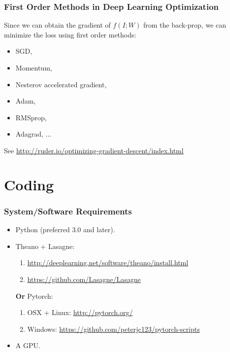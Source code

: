 \documentclass[10pt]{beamer}
\begin{document}
\begin{frame}
\frametitle{First Order Methods in Deep Learning Optimization}
Since we can obtain the gradient of $f(I;W)$ from the back-prop, we can minimize the loss using first order methods:
\begin{itemize}
	\item SGD,
	\item Momentum,
	\item Nesterov accelerated gradient,
	\item Adam,
	\item RMSprop,
	\item Adagrad, ...
\end{itemize}
See \url{http://ruder.io/optimizing-gradient-descent/index.html}
\end{frame}

\section{Coding}
\begin{frame}
\frametitle{System/Software Requirements}
\begin{itemize}
	\item Python (preferred 3.0 and later).
	\item Theano + Lasagne:
	\begin{enumerate}
		\item \url{http://deeplearning.net/software/theano/install.html}
		\item \url{https://github.com/Lasagne/Lasagne}
	\end{enumerate}
	\textbf{Or} Pytorch:
	\begin{enumerate}
		\item OSX + Linux: \url{http://pytorch.org/}
		\item Windows: \url{https://github.com/peterjc123/pytorch-scripts}
	\end{enumerate} 
	\item A GPU.
\end{itemize}
\end{frame}
\end{document}
